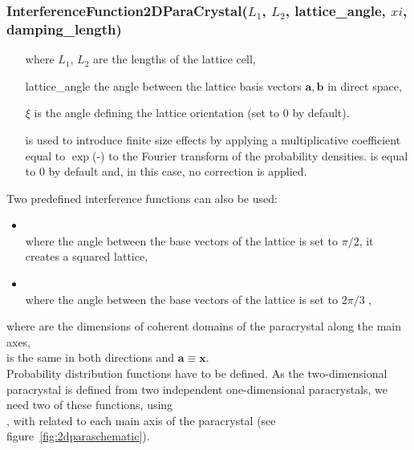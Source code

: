 \FloatBarrier

\newpage%
\subsubsection{InterferenceFunction2DParaCrystal($L_1$, $L_2$, lattice\_angle, $xi$, damping\_length)} %
\begin{itemize}
\item[where] $L_1$, $L_2$ are the lengths of the lattice cell,
\item[] lattice\_angle the angle between the lattice basis vectors $\mathbf{a}, \mathbf{b}$ in direct space,
\item[] $\xi$ is the angle defining the lattice orientation (set to $0$ by default).
\item[]  is used to introduce finite size effects by applying a multiplicative coefficient equal to  $\exp$(-) to the Fourier transform of the probability densities.  is equal to 0 by default and, in this case, no correction is applied.
\end{itemize}
Two predefined interference functions can also be used:
\begin{itemize}
\item  {}\\
where the angle between the base vectors of the lattice is set to $\pi/2$,
it creates a squared lattice,
\item {}\\
where the angle between the base vectors of the lattice is set to $2\pi/3$ ,
\end{itemize}
where
 are the dimensions of coherent domains of the paracrystal along the main axes,\\  is the same in both directions and $\mathbf{a}\equiv \mathbf{x}$.\\

Probability distribution functions have to be defined. As the two-dimensional paracrystal is defined from two independent one-dimensional paracrystals, we need two of these functions, using\\ , with  related to each main axis of the paracrystal (see figure~\ref{fig:2dparaschematic}).


